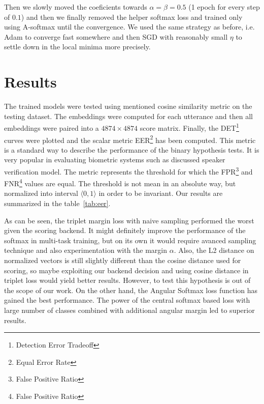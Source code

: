 \medskip
\noindent
Then we slowly moved the coeficients towards $ \alpha = \beta = 0.5 $ (1 epoch for every step of $ 0.1 $) and then we finally removed the helper softmax loss and trained only using A-softmax until the convergence. We used the same strategy as before, i.e. Adam to converge fast somewhere and then SGD with reasonably small $ \eta $ to settle down in the local minima more precisely.

\section{Results}

The trained models were tested using mentioned cosine similarity metric on the testing dataset. The embeddings were computed for each utterance and then all embeddings were paired into a $ 4874 \times 4874 $ score matrix. Finally, the DET\footnote{Detection Error Tradeoff} curves were plotted and the scalar metric EER\footnote{Equal Error Rate} has been computed. This metric is a standard way to describe the performance of the binary hypothesis tests. It is very popular in evaluating biometric systems such as discussed speaker verification model. The metric represents the threshold for which the FPR\footnote{False Positive Ratio} and FNR\footnote{False Positive Ratio} values are equal. The threshold is not mean in an absolute way, but normalized into interval $ \langle 0, 1 \rangle $ in order to be invariant. Our results are summarized in the table~\ref{tab:eer}.



\medskip
\noindent
As can be seen, the triplet margin loss with naive sampling performed the worst given the scoring backend. It might definitely improve the performance of the softmax in multi-task training, but on its own it would require avanced sampling technique and also experimentation with the margin $ \alpha $. Also, the L2 distance on normalized vectors is still slightly different than the cosine distance used for scoring, so maybe exploiting our backend decision and using cosine distance in triplet loss would yield better results. However, to test this hypothesis is out of the scope of our work. On the other hand, the Angular Softmax loss function has gained the best performance. The power of the central softmax based loss with large number of classes combined with additional angular margin led to superior results.

